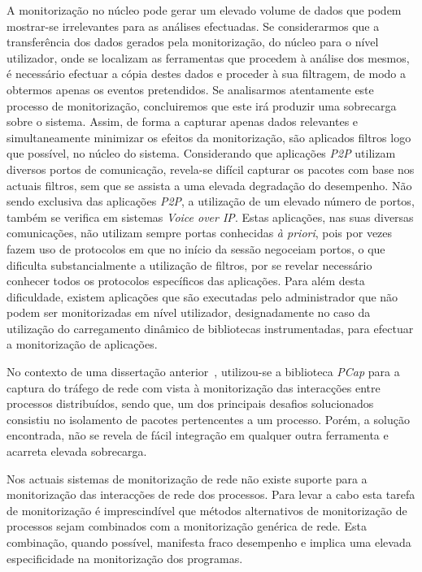 A monitorização no núcleo pode gerar um elevado volume de dados que podem mostrar-se irrelevantes para as análises efectuadas.
Se considerarmos que a transferência dos dados gerados pela monitorização, do núcleo para o nível utilizador, onde se localizam as ferramentas que procedem à análise dos mesmos, é necessário efectuar a cópia destes dados e proceder à sua filtragem, de modo a obtermos apenas os eventos pretendidos.
Se analisarmos atentamente este processo de monitorização, concluiremos que este irá produzir uma sobrecarga sobre o sistema.
Assim, de forma a capturar apenas dados relevantes e simultaneamente minimizar os efeitos da monitorização, são aplicados filtros logo que possível, no núcleo do sistema.
Considerando que aplicações \textit{P2P} utilizam diversos portos de comunicação, revela-se difícil capturar os pacotes com base nos actuais filtros, sem que se assista a uma elevada degradação do desempenho.
Não sendo exclusiva das aplicações \textit{P2P}, a utilização de um elevado número de portos, também se verifica em sistemas \textit{Voice over IP}.
Estas aplicações, nas suas diversas comunicações, não utilizam sempre portas conhecidas \textit{à priori}, pois por vezes fazem uso de protocolos em que no início da sessão negoceiam portos, o que dificulta substancialmente a utilização de filtros, por se revelar necessário conhecer todos os protocolos específicos das aplicações.
Para além desta dificuldade, existem aplicações que são executadas pelo administrador que não podem ser monitorizadas em nível utilizador, designadamente no caso da utilização do carregamento dinâmico de bibliotecas instrumentadas, para efectuar a monitorização de aplicações.

No contexto de uma dissertação anterior~\cite{Farruca:2009}, utilizou-se a biblioteca \textit{PCap} para a captura do tráfego de rede com vista à monitorização das interacções entre processos distribuídos, sendo que, um dos principais desafios solucionados consistiu no isolamento de pacotes pertencentes a um processo.
Porém, a solução encontrada, não se revela de fácil integração em qualquer outra ferramenta e acarreta elevada sobrecarga.

Nos actuais sistemas de monitorização de rede não existe suporte para a monitorização das interacções de rede dos processos.
Para levar a cabo esta tarefa de monitorização é imprescindível que métodos alternativos de monitorização de processos sejam combinados com a monitorização genérica de rede.
Esta combinação, quando possível, manifesta fraco desempenho e implica uma elevada especificidade na monitorização dos programas.


